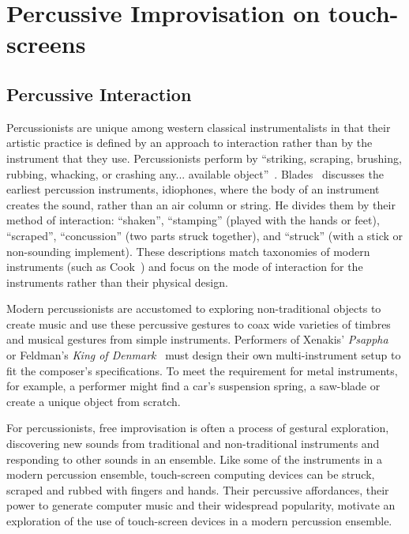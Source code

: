 \documentclass[graybox]{svmult}
\begin{document}
\section{Percussive Improvisation on touch-screens}


\subsection{Percussive Interaction}

Percussionists are unique among western classical instrumentalists in
that their artistic practice is defined by an approach to interaction
rather than by the instrument that they use. Percussionists perform by
``striking, scraping, brushing, rubbing, whacking, or crashing any...
available object''~\cite{Schick:2006fk}. Blades~\cite{Blades:1992kx}
discusses the earliest percussion instruments, idiophones, where the
body of an instrument creates the sound, rather than an air column or
string. He divides them by their method of interaction: ``shaken'',
``stamping'' (played with the hands or feet), ``scraped'',
``concussion'' (two parts struck together), and ``struck'' (with a
stick or non-sounding implement). These descriptions match taxonomies
of modern instruments (such as Cook~\cite{Cook:1997vn}) and focus on
the mode of interaction for the instruments rather than their physical
design.

Modern percussionists are accustomed to exploring non-traditional
objects to create music and use these percussive gestures to coax wide
varieties of timbres and musical gestures from simple instruments.
Performers of Xenakis' \emph{Psappha}~\cite{Xenakis:1975uq} or
Feldman's \emph{King of Denmark}~\cite{Feldman:1965uq} must design
their own multi-instrument setup to fit the composer's specifications.
To meet the requirement for metal instruments, for example, a
performer might find a car's suspension spring, a saw-blade or create
a unique object from scratch.

For percussionists, free improvisation is often a process of gestural
exploration, discovering new sounds from traditional and
non-traditional instruments and responding to other sounds in an
ensemble. Like some of the instruments in a modern percussion
ensemble, touch-screen computing devices can be struck, scraped and
rubbed with fingers and hands. Their percussive affordances, their
power to generate computer music and their widespread popularity,
motivate an exploration of the use of touch-screen devices in a modern
percussion ensemble.
\end{document}
